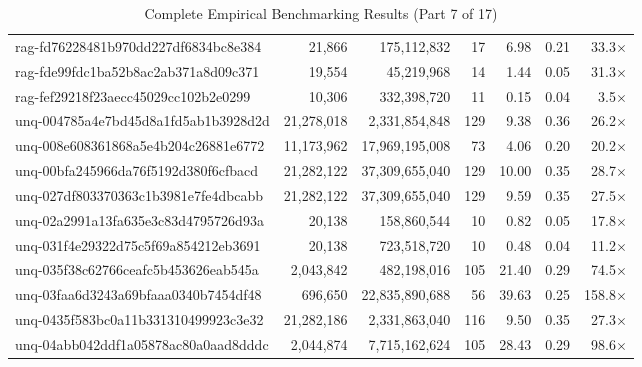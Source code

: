 \begin{table}[h!]
\begin{tabular}{lrrrrrr}
rag-fd76228481b970dd227df6834bc8e384 & 21,866 & 175,112,832 & 17 & 6.98 & 0.21 & 33.3$\times$ \\
rag-fde99fdc1ba52b8ac2ab371a8d09c371 & 19,554 & 45,219,968 & 14 & 1.44 & 0.05 & 31.3$\times$ \\
rag-fef29218f23aecc45029cc102b2e0299 & 10,306 & 332,398,720 & 11 & 0.15 & 0.04 & 3.5$\times$ \\
unq-004785a4e7bd45d8a1fd5ab1b3928d2d & 21,278,018 & 2,331,854,848 & 129 & 9.38 & 0.36 & 26.2$\times$ \\
unq-008e608361868a5e4b204c26881e6772 & 11,173,962 & 17,969,195,008 & 73 & 4.06 & 0.20 & 20.2$\times$ \\
unq-00bfa245966da76f5192d380f6cfbacd & 21,282,122 & 37,309,655,040 & 129 & 10.00 & 0.35 & 28.7$\times$ \\
unq-027df803370363c1b3981e7fe4dbcabb & 21,282,122 & 37,309,655,040 & 129 & 9.59 & 0.35 & 27.5$\times$ \\
unq-02a2991a13fa635e3c83d4795726d93a & 20,138 & 158,860,544 & 10 & 0.82 & 0.05 & 17.8$\times$ \\
unq-031f4e29322d75c5f69a854212eb3691 & 20,138 & 723,518,720 & 10 & 0.48 & 0.04 & 11.2$\times$ \\
unq-035f38c62766ceafc5b453626eab545a & 2,043,842 & 482,198,016 & 105 & 21.40 & 0.29 & 74.5$\times$ \\
unq-03faa6d3243a69bfaaa0340b7454df48 & 696,650 & 22,835,890,688 & 56 & 39.63 & 0.25 & 158.8$\times$ \\
unq-0435f583bc0a11b331310499923c3e32 & 21,282,186 & 2,331,863,040 & 116 & 9.50 & 0.35 & 27.3$\times$ \\
unq-04abb042ddf1a05878ac80a0aad8dddc & 2,044,874 & 7,715,162,624 & 105 & 28.43 & 0.29 & 98.6$\times$ \\
\bottomrule
\end{tabular}
\caption{Complete Empirical Benchmarking Results (Part 7 of 17)}
\end{table}

\clearpage

